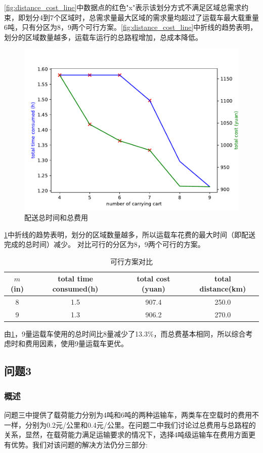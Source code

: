 \documentclass{cumcmthesis}
\begin{document}
    \cref{fig:distance_cost_line}中数据点的红色"x"表示该划分方式不满足区域总需求约束，即划分4到7个区域时，总需求量最大区域的需求量均超过了运载车最大载重量6吨，只有分区为8，9两个可行方案。\cref{fig:distance_cost_line}中折线的趋势表明，划分的区域数量越多，运载车运行的总路程增加，总成本降低。

    \begin{figure}[H]
        \centering
        \includegraphics[width=.7\textwidth]{figure//time_cost_line.pdf}
        \caption{配送总时间和总费用}
        \label{fig:time_cost_line}
    \end{figure}

    \cref{fig:time_cost_line}中折线的趋势表明，划分的区域数量越多，所以运载车花费的最大时间（即配送完成的总时间）减少。
    对比可行的分区为8，9两个可行的方案。

    \begin{table}[!h]
        \caption{可行方案对比}\label{tab:001} \centering
        \begin{tabular}{cccc}
            \toprule[1.5pt]
            $m$(in) & total time consumed(h) & total cost (yuan) & total distance(km) \\
            \midrule[1pt]
            8 & 1.5 & 907.4 & 250.0\\
            9 & 1.3 & 906.2 & 270.0\\
            \bottomrule[1.5pt]
        \end{tabular}
    \end{table}

    由\cref{tab:001}，9量运载车使用的总时间比8量减少了13.3\%，而总费基本相同，所以综合考虑时和费用因素，使用9量运载车更优。

\subsection{问题3}
    \subsubsection{概述}
    问题三中提供了载荷能力分别为4吨和6吨的两种运输车，两类车在空载时的费用不一样，分别为0.2元/公里和0.4元/公里。在问题二中我们讨论过总费用与总路程的关系，显然，在载荷能力满足运输要求的情况下，选择4吨级运输车在费用方面更有优势。我们对该问题的解决方法仍分三部分:
\end{document}
